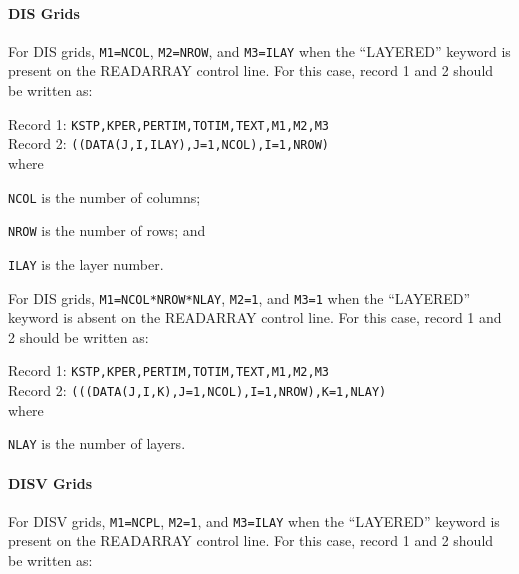 \paragraph{DIS Grids}
For DIS grids,  \texttt{M1=NCOL}, \texttt{M2=NROW}, and \texttt{M3=ILAY} when the ``LAYERED'' keyword is present on the READARRAY control line. For this case, record 1 and 2 should be written as:

\vspace{5mm}
\noindent Record 1: \texttt{KSTP,KPER,PERTIM,TOTIM,TEXT,M1,M2,M3} \\
\noindent Record 2: \texttt{((DATA(J,I,ILAY),J=1,NCOL),I=1,NROW)} \\

\vspace{5mm}
\noindent where

\begin{description} \itemsep0pt \parskip0pt 
\item \texttt{NCOL} is the number of columns;
\item \texttt{NROW} is the number of rows; and
\item \texttt{ILAY} is the layer number.
\end{description}

\noindent For DIS grids, \texttt{M1=NCOL*NROW*NLAY}, \texttt{M2=1}, and \texttt{M3=1} when the ``LAYERED'' keyword is absent on the READARRAY control line. For this case, record 1 and 2 should be written as:

\vspace{5mm}
\noindent Record 1: \texttt{KSTP,KPER,PERTIM,TOTIM,TEXT,M1,M2,M3} \\
\noindent Record 2: \texttt{(((DATA(J,I,K),J=1,NCOL),I=1,NROW),K=1,NLAY)} \\

\vspace{5mm}
\noindent where

\begin{description} \itemsep0pt \parskip0pt 
\item \texttt{NLAY} is the number of layers.
\end{description}

\paragraph{DISV Grids}
For DISV grids, \texttt{M1=NCPL}, \texttt{M2=1}, and \texttt{M3=ILAY} when the ``LAYERED'' keyword is present on the READARRAY control line. For this case, record 1 and 2 should be written as:

